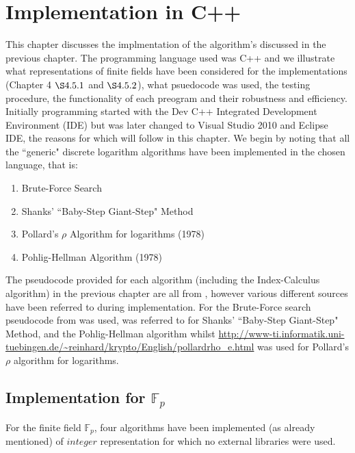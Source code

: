 \documentclass[iwp,first]{luthesis}
\begin{document}
\chapter{Implementation in C++}

This chapter discusses the implmentation of the algorithm's discussed in the previous chapter. The programming language used was C++ and we illustrate what representations of finite fields have been considered for the implementations (Chapter 4 $\S4.5.1$ and $\S4.5.2$), what psuedocode was used, the testing procedure, the functionality of each preogram and their robustness and efficiency. Initially programming started with the Dev C++ Integrated Development Environment (IDE) but was later changed to Visual Studio 2010 and Eclipse IDE, the reasons for which will follow in this chapter.
We begin by noting that all the ``generic" discrete logarithm algorithms have been implemented in the chosen language, that is:

\begin{enumerate}

\item Brute-Force Search

\item Shanks' ``Baby-Step Giant-Step" Method

\item Pollard's $\rho$ Algorithm for logarithms (1978)

\item Pohlig-Hellman Algorithm (1978)

\end{enumerate}

The pseudocode provided for each algorithm (including the Index-Calculus algorithm) in the previous chapter are all from \cite{HAC}, however various different sources have been referred to during implementation. For the Brute-Force search pseudocode from \cite{MSc2} was used, \cite{HAC} was referred to for Shanks' ``Baby-Step Giant-Step" Method, and the Pohlig-Hellman algorithm whilst \url{http://www-ti.informatik.uni-tuebingen.de/~reinhard/krypto/English/pollardrho_e.html} was used for Pollard's $\rho$ algorithm for logarithms.



\section{Implementation for $\mathbb{F}_p$}

For the finite field $\mathbb{F}_p$, four algorithms have been implemented (as already mentioned) of $integer$ representation for which no external libraries were used. 
\end{document}
